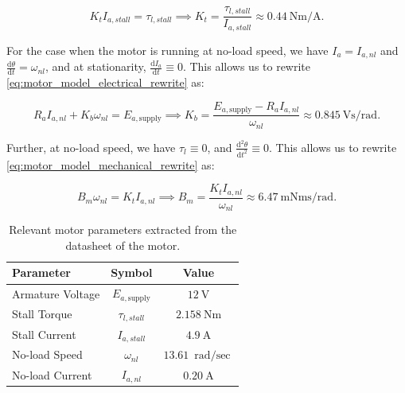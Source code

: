 \begin{equation}
    \label{eq:torque_constant}
    K_t I_{a, stall} = \tau_{l, stall} \implies K_t = \frac{\tau_{l, stall}}{I_{a, stall}} \approx \SI{0.44}{\newton\meter\per\ampere}.
\end{equation}

For the case when the motor is running at no-load speed, we have $I_a = I_{a, nl}$ and $\frac{\mathrm{d}\theta}{\mathrm{d}t} = \omega_{nl}$, and at stationarity, $\frac{\mathrm{d}I_a}{\mathrm{d}t}\equiv0$. This allows us to rewrite \cref{eq:motor_model_electrical_rewrite} as:

\begin{equation}
    \label{eq:back_emf_constant}
    R_a I_{a, nl} + K_b \omega_{nl}  = E_{a, \text{supply}} \implies K_b = \frac{E_{a, \text{supply}} - R_a I_{a, nl}}{\omega_{nl}} \approx \SI{0.845}{\volt\second\per\radian}.
\end{equation}

Further, at no-load speed, we have $\tau_l \equiv 0$, and $\frac{\mathrm{d}^2\theta}{\mathrm{d}t^2}\equiv0$. This allows us to rewrite \cref{eq:motor_model_mechanical_rewrite} as:

\begin{equation}
    \label{eq:friction_coefficient}
    B_m \omega_{nl} = K_t I_{a, nl} \implies B_m = \frac{K_t I_{a, nl}}{\omega_{nl}} \approx \SI{6.47}{\milli\newton\meter\second\per\radian}.
\end{equation}

\begin{table}%
    \caption{Relevant motor parameters extracted from the datasheet of the motor.}
    \label{tab:motor_params}
    \centering
    \begin{tabular}{lcc}
        \toprule
        Parameter & Symbol & Value \\
        \midrule
        Armature Voltage & $E_{a, \text{supply}}$ & $\SI{12}{\volt}$ \\
        Stall Torque & $\tau_{l, stall}$ & $\SI{2.158}{\newton\meter}$ \\
        Stall Current & $I_{a, stall}$ & $\SI{4.9}{\ampere}$ \\
        No-load Speed & $\omega_{nl}$ & $\SI{13.61}{\radian\per\sec}$ \\
        No-load Current & $I_{a, nl}$ & $\SI{0.20}{\ampere}$ \\
        \bottomrule
    \end{tabular}
\end{table}

